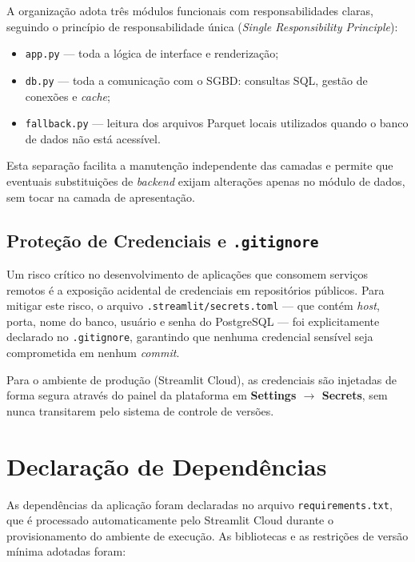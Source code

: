 \documentclass[12pt,a4paper]{report}
\begin{document}
A organização adota três módulos funcionais com responsabilidades claras, seguindo o
princípio de responsabilidade única (\textit{Single Responsibility Principle}):

\begin{itemize}
    \item \texttt{app.py} — toda a lógica de interface e renderização;
    \item \texttt{db.py} — toda a comunicação com o SGBD: consultas SQL, gestão de
    conexões e \textit{cache};
    \item \texttt{fallback.py} — leitura dos arquivos Parquet locais utilizados
    quando o banco de dados não está acessível.
\end{itemize}

Esta separação facilita a manutenção independente das camadas e permite que eventuais
substituições de \textit{backend} exijam alterações apenas no módulo de dados, sem
tocar na camada de apresentação.

\subsection{Proteção de Credenciais e \texttt{.gitignore}}

Um risco crítico no desenvolvimento de aplicações que consomem serviços remotos é a
exposição acidental de credenciais em repositórios públicos. Para mitigar este risco, o
arquivo \texttt{.streamlit/secrets.toml} — que contém \textit{host}, porta, nome do
banco, usuário e senha do PostgreSQL — foi explicitamente declarado no
\texttt{.gitignore}, garantindo que nenhuma credencial sensível seja comprometida
em nenhum \textit{commit}.

Para o ambiente de produção (Streamlit Cloud), as credenciais são injetadas de forma
segura através do painel da plataforma em \textbf{Settings $\rightarrow$ Secrets}, sem nunca
transitarem pelo sistema de controle de versões.

\section{Declaração de Dependências}

As dependências da aplicação foram declaradas no arquivo \texttt{requirements.txt},
que é processado automaticamente pelo Streamlit Cloud durante o provisionamento do
ambiente de execução. As bibliotecas e as restrições de versão mínima adotadas foram:
\end{document}
